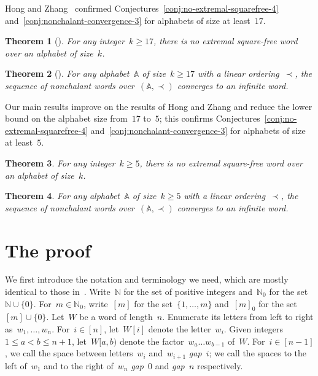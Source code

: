 \documentclass[12pt]{article}
\theoremstyle{plain}
\newtheorem{theorem}{Theorem}[section]
\theoremstyle{definition}
\newcommand\N{\mathbb{N}}
\newcommand{\A}{\mathbb A}
\begin{document}
	Hong and Zhang~\cite{HongZhang} confirmed Conjectures~\ref{conj:no-extremal-squarefree-4} and~\ref{conj:nonchalant-convergence-3} for alphabets of size at least~$17$.
	
	\begin{theorem}[\cite{HongZhang}]
		For any integer~$k\ge17$, there is no extremal square-free word over an alphabet of size~$k$.
	\end{theorem}
	
	\begin{theorem}[\cite{HongZhang}]
		For any alphabet~$\A$ of size~$k\ge17$ with a linear ordering~$\prec$, the sequence of nonchalant words over~$(\A,\prec)$ converges to an infinite word.
	\end{theorem}
	
	Our main results improve on the results of Hong and Zhang and reduce the lower bound on the alphabet size from~$17$ to~$5$; this confirms Conjectures~\ref{conj:no-extremal-squarefree-4} and~\ref{conj:nonchalant-convergence-3} for alphabets of size at least~$5$.
	
	\begin{theorem} \label{thm:no-extremal-squarefree-5}
		For any integer~$k\ge5$, there is no extremal square-free word over an alphabet of size~$k$.
	\end{theorem}
	
	\begin{theorem} \label{thm:nonchalant-converges-5}
		For any alphabet~$\A$ of size~$k\ge5$ with a linear ordering~$\prec$, the sequence of nonchalant words over~$(\A,\prec)$ converges to an infinite word.
	\end{theorem}
	
	\section{The proof}
	
	We first introduce the notation and terminology we need, which are mostly identical to those in~\cite{HongZhang}. Write~$\N$ for the set of positive integers and~$\N_0$ for the set~$\N\cup\{0\}$. For~$m\in\N_0$, write~$[m]$ for the set~$\{1,\dots,m\}$ and~$[m]_0$ for the set~$[m]\cup\{0\}$. Let~$W$ be a word of length~$n$. Enumerate its letters from left to right as~$w_1,\dots,w_n$. For~$i\in[n]$, let~$W[i]$ denote the letter~$w_i$. Given integers~$1\le a<b\le n+1$, let~$W[a,b)$ denote the factor~$w_a\dots w_{b-1}$ of~$W$. For~$i\in[n-1]$, we call the space between letters~$w_i$ and~$w_{i+1}$ \emph{gap~$i$}; we call the spaces to the left of~$w_1$ and to the right of~$w_n$ \emph{gap~$0$} and \emph{gap~$n$} respectively.
	
\end{document}
